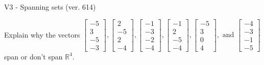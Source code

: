 \begin{exercise}
  \begin{exerciseTitle}V3 - Spanning sets (ver. 614)\end{exerciseTitle}
  \begin{exerciseStatement}
    Explain why the vectors \(\left[\begin{array}{r}
-5 \\
3 \\
-5 \\
-3
\end{array}\right] , \left[\begin{array}{r}
2 \\
-5 \\
2 \\
-4
\end{array}\right] , \left[\begin{array}{r}
-1 \\
-3 \\
-2 \\
-4
\end{array}\right] , \left[\begin{array}{r}
-1 \\
2 \\
-5 \\
-4
\end{array}\right] , \left[\begin{array}{r}
-5 \\
3 \\
0 \\
4
\end{array}\right] , \text{ and } \left[\begin{array}{r}
-4 \\
-3 \\
-1 \\
-5
\end{array}\right]\) span or don't span \(\mathbb{R}^4\). 
	



\end{exerciseStatement}
\end{exercise}
